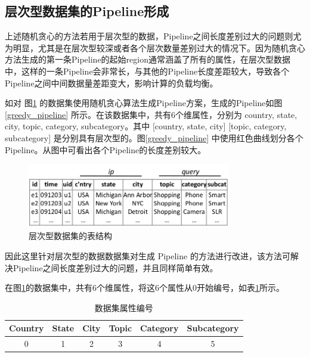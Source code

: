 \subsection{层次型数据集的Pipeline形成}

上述随机贪心的方法若用于层次型的数据，Pipeline之间长度差别过大的问题则尤为明显，尤其是在层次型较深或者各个层次数量差别过大的情况下。因为随机贪心方法生成的第一条Pipeline的起始region通常涵盖了所有的属性，在层次型数据中，这样的一条Pipeline会非常长，与其他的Pipeline长度差距较大，导致各个Pipeline之间中间数据量差距变大，影响计算的负载均衡。

如对 图\ref{dataset_table1} 的数据集使用随机贪心算法生成Pipeline方案，生成的Pipeline如图 \ref{greedy_pipeline} 所示。在该数据集中，共有6个维属性，分别为 country, state, city, topic, category, subcategory。其中 [country, state, city] [topic, category, subcategory] 是分别具有层次型的。图\ref{greedy_pipeline} 中使用红色曲线划分各个Pipeline。从图中可看出各个Pipeline的长度差别较大。

\begin{figure}[!htb]
\centering\includegraphics[width=3.5in]{picture/ch_datacube_mr/dataset_table} 
\caption{层次型数据集的表结构}\label{dataset_table1} 
\end{figure} 

因此这里针对层次型的数据数据集对生成 Pipeline 的方法进行改进，该方法可解决Pipeline之间长度差别过大的问题，并且同样简单有效。



在图\ref{dataset_table1}的数据集中，共有6个维属性，将这6个属性从0开始编号，如表\ref{attribute_no}所示。

\begin{table}[!htb]
\begin{center}
\begin{tabular}{|c|c|c|c|c|c|}
\hline 
Country & State & City & Topic & Category & Subcategory \\ 
\hline 
0 & 1 & 2 & 3 & 4 & 5 \\ 
\hline 
\end{tabular} 
\end{center}
\caption{数据集属性编号}\label{attribute_no}
\end{table}

